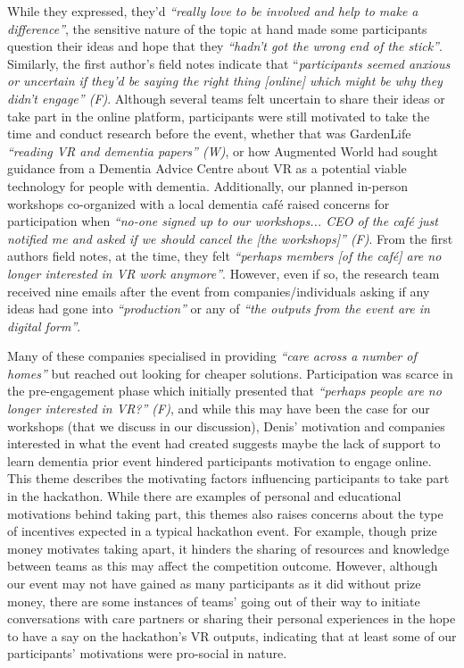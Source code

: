 While they expressed, they’d \textit{“really love to be involved and help to make a difference”}, the sensitive nature of the topic at hand made some participants question their ideas and hope that they \textit{“hadn’t got the wrong end of the stick”}. Similarly, the first author’s field notes indicate that “\textit{participants seemed anxious or uncertain if they’d be saying the right thing [online] which might be why they didn’t engage” (F)}. Although several teams felt uncertain to share their ideas or take part in the online platform, participants were still motivated to take the time and conduct research before the event, whether that was GardenLife \textit{“reading VR and dementia papers” (W)}, or how Augmented World had sought guidance from a Dementia Advice Centre about VR as a potential viable technology for people with dementia. Additionally, our planned in-person workshops co-organized with a local dementia café raised concerns for participation when \textit{“no-one signed up to our workshops... CEO of the café just notified me and asked if we should cancel the [the workshops]” (F)}. From the first authors field notes, at the time, they felt \textit{“perhaps members [of the café] are no longer interested in VR work anymore”}. However, even if so, the research team received nine emails after the event from companies/individuals asking if any ideas had gone into \textit{“production”} or any of \textit{“the outputs from the event are in digital form”}. 

Many of these companies specialised in providing \textit{“care across a number of homes”} but reached out looking for cheaper solutions. Participation was scarce in the pre-engagement phase which initially presented that\textit{ “perhaps people are no longer interested in VR?” (F)}, and while this may have been the case for our workshops (that we discuss in our discussion), Denis’ motivation and companies interested in what the event had created suggests maybe the lack of support to learn dementia prior event hindered participants motivation to engage online. This theme describes the motivating factors influencing participants to take part in the hackathon. While there are examples of personal and educational motivations behind taking part, this themes also raises concerns about the type of incentives expected in a typical hackathon event. For example, though prize money motivates taking apart, it hinders the sharing of resources and knowledge between teams as this may affect the competition outcome. However, although our event may not have gained as many participants as it did without prize money, there are some instances of teams’ going out of their way to initiate conversations with care partners or sharing their personal experiences in the hope to have a say on the hackathon’s VR outputs, indicating that at least some of our participants’ motivations were pro-social in nature.

